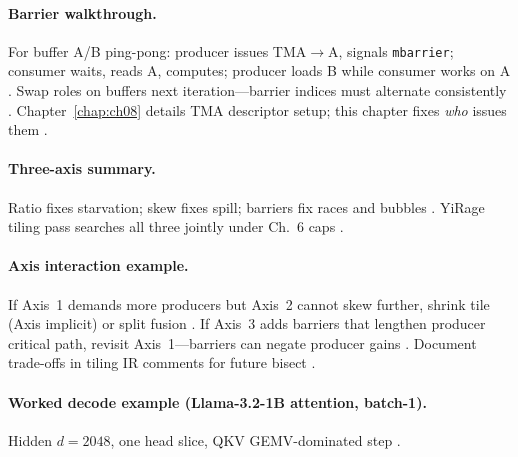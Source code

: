 \paragraph{Barrier walkthrough.}
For buffer A/B ping-pong: producer issues TMA$\rightarrow$A, signals \texttt{mbarrier}; consumer waits, reads A, computes; producer loads B while consumer works on A \citep{semianalysis2024tma,shah2024flashattention3}.
Swap roles on buffers next iteration---barrier indices must alternate consistently \citep{nvidia2022hopper,yirage2026}.
Chapter~\ref{chap:ch08} details TMA descriptor setup; this chapter fixes \emph{who} issues them \citep{semianalysis2024tma,dao2022flashattention,patel2025llminference}.

\paragraph{Three-axis summary.}
Ratio fixes starvation; skew fixes spill; barriers fix races and bubbles \citep{shah2024flashattention3,memoryfloor2026,yirage2026}.
YiRage tiling pass searches all three jointly under Ch.~6 caps \citep{wu2024mirage,chen2020compilerbasedhardw,mpk2025}.

\paragraph{Axis interaction example.}
If Axis~1 demands more producers but Axis~2 cannot skew further, shrink tile (Axis implicit) or split fusion \citep{yirage2026,dao2022flashattention,shah2024flashattention3}.
If Axis~3 adds barriers that lengthen producer critical path, revisit Axis~1---barriers can negate producer gains \citep{semianalysis2024tma,nvidia2022hopper,patel2025llminference}.
Document trade-offs in tiling IR comments for future bisect \citep{chen2020compilerbasedhardw,wu2024mirage,mpk2025}.

\paragraph{Worked decode example (Llama-3.2-1B attention, batch-1).}
Hidden $d{=}2048$, one head slice, QKV GEMV-dominated step \citep{taxbreak2026,kwon2023vllm}.

